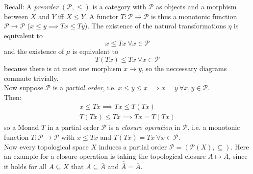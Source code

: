 \begin{example}[preorder]
Recall: A \textit{preorder} $(\mathcal{P},\le)$ is a category with $\mathcal{P}$ as objects and 
a morphism between $X$ and $Y$ iff $X \le Y$.
A functor $T\colon \mathcal{P} \to \mathcal{P}$ is thus a monotonic function $\mathcal{P}\to \mathcal{P}$
($x \le y \implies Tx\le Ty$).
The existence of the natural transformations $\eta$ is equivalent to
\[x \le Tx \ \forall x \in \mathcal{P}\]
and the existence of $\mu$ is equivalent to
\[T(Tx) \le Tx \ \forall x \in \mathcal{P}\] 
because there is at most one morphism $x \to y$, so the neccessary diagrams commute trivially.\\
Now suppose $\mathcal{P}$ is a \textit{partial order}, i.e. $x \le y \le x \implies x = y \ \forall x,y \in \mathcal{P}$. \\
Then:
\begin{align*}
    x \le Tx \implies Tx \le T(Tx) \\
    T(Tx) \le Tx \implies Tx = T(Tx)
\end{align*}
so a Monad $T$ in a partial order $\mathcal{P}$ is a \textit{closure operation} in $\mathcal{P}$, i.e. 
a monotonic function $T \colon \mathcal{P} \to \mathcal{P}$ 
with $x \le Tx$ and $T(Tx)=Tx \ \forall x \in \mathcal{P}.$ \\
Now every topological space $X$ induces a partial order $\mathcal{P} = (\mathscr{P}(X),\subseteq)$.
Here an example for a closure operation is taking the topological closure $A \mapsto \overline{A}$,
since it holds for all $A \subseteq X$ that $A \subseteq \overline{A}$ and
$\overline{\overline{A}} = \overline{A}$.
\end{example}

